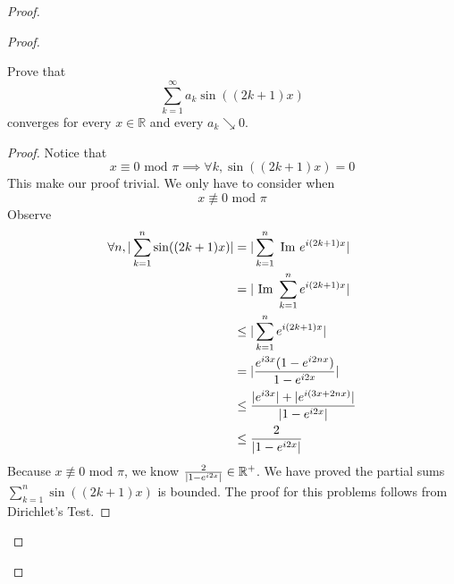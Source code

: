 \documentclass{report}
\begin{document}
\begin{proof}
\begin{proof}
\begin{question}{}{}
Prove that 
\[
\sum_{k=1}^{\infty} a_k \sin((2k + 1)x)
\]
converges for every \( x \in \mathbb{R} \) and every \( a_k \searrow 0 \).
\end{question}
\begin{proof}
Notice that  
\begin{equation}
x\equiv 0\text{ mod $\pi$}\implies \forall k,\sin ((2k+1)x)=0
\end{equation}
This make our proof trivial. We only have to consider when 
\begin{equation}
x\not\equiv 0\text{ mod }\pi
\end{equation}
Observe
\begin{align}
 \forall n, |\sum_{k=1}^n \sin((2k+1)x)|&= |\sum_{k=1}^n \text{ Im }e^{i(2k+1)x}|\\
  &=|\text{ Im }\sum_{k=1}^n e^{i(2k+1)x}|\\
  &\leq |\sum_{k=1}^n e^{i(2k+1)x}|\\
  &=|\frac{e^{i3x}(1-e^{i2nx})}{1-e^{i2x}}|\\
  &\leq \frac{|e^{i3x}|+|e^{i(3x+2nx)}|}{|1-e^{i2x}|}\\
  &\leq \frac{2}{|1-e^{i 2x}|}
\end{align}
Because $x\not\equiv 0\text{ mod $\pi$}$, we know $\frac{2}{|1-e^{i2x}|}\in\mathbb{R}^+$. We have proved the partial sums $\sum_{k=1}^n \sin((2k+1)x)$ is bounded. The proof for this problems follows from Dirichlet's Test.

\end{proof}


\end{proof}
\end{proof}
\end{document}
